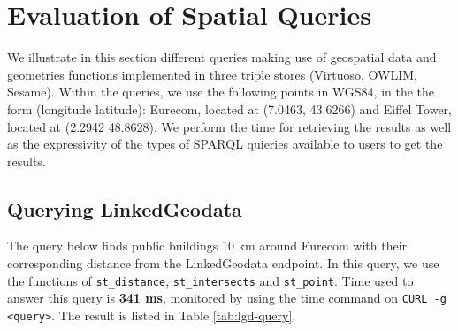 \begin{table}[!htbp]
\end{table}


\section{Evaluation of Spatial Queries}
\label{sec:geoqueries}

We illustrate in this section different queries making use of geospatial data and geometries functions implemented in three triple stores (Virtuoso, OWLIM, Sesame). Within the queries, we use the following points in WGS84, in the the form (longitude latitude): Eurecom, located at (7.0463, 43.6266) and Eiffel Tower, located at (2.2942 48.8628). We perform the time for retrieving the results as well as the expressivity of the types of SPARQL quieries available to users to get the results.

\subsection{Querying LinkedGeodata}
\label{sec:linkedgeodata}

The query below finds public buildings 10 km around Eurecom with their corresponding distance from the LinkedGeodata endpoint. In this query, we use the functions of \texttt{st\_distance}, \texttt{st\_intersects} and \texttt{st\_point}. Time used to answer this query is \textbf{341 ms}, monitored by using the time command on \texttt{CURL -g <query>}. The result is listed in Table \ref{tab:lgd-query}.


